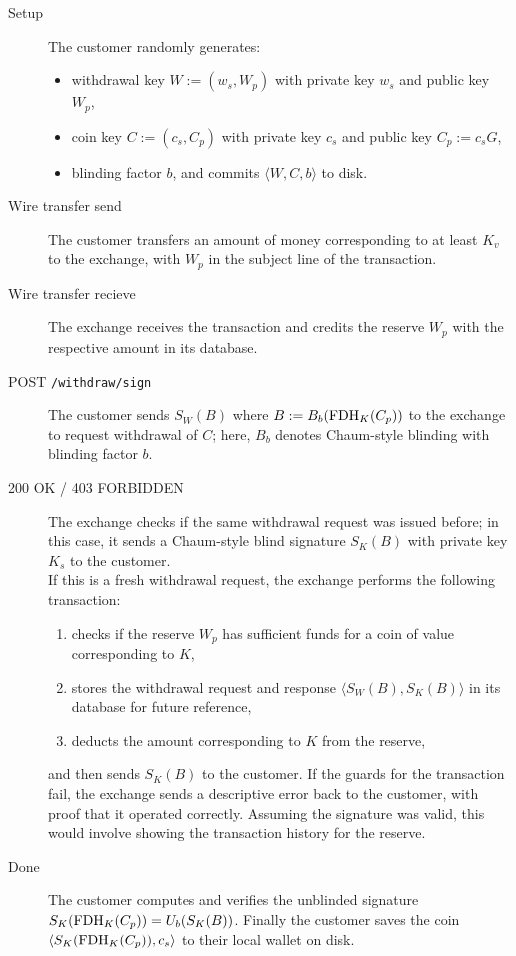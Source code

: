 \documentclass{llncs}
\begin{document}
\begin{description}
  \item[Setup] The customer randomly generates:
    \begin{itemize}
      \item withdrawal key $W := (w_s,W_p)$ with private key $w_s$ and public key $W_p$,
      \item coin key $C := (c_s,C_p)$ with private key $c_s$ and public key $C_p := c_s G$,
      \item blinding factor $b$, and commits $\langle W, C, b \rangle$ to disk.
    \end{itemize}
  \item[Wire transfer send]
    The customer transfers an amount of money corresponding to
    at least $K_v$ to the exchange, with $W_p$ in the subject line
    of the transaction.
  \item[Wire transfer recieve]
    The exchange receives the transaction and credits the reserve $W_p$
    with the respective amount in its database.
  \item[POST {\tt /withdraw/sign}]
    The customer sends $S_W(B)$ where $B := B_b(\textrm{FDH}_K(C_p))$ to
    the exchange to request withdrawal of $C$; here, $B_b$ denotes
    Chaum-style blinding with blinding factor $b$.
  \item[200 OK / 403 FORBIDDEN]
    The exchange checks if the same withdrawal request was issued before;
    in this case, it sends a Chaum-style blind signature $S_K(B)$ with
    private key $K_s$ to the customer. \\
    If this is a fresh withdrawal request, the exchange performs the following transaction:
    \begin{enumerate}
      \item checks if the reserve $W_p$ has sufficient funds
            for a coin of value corresponding to $K$,
      \item stores the withdrawal request and response
            $\langle S_W(B), S_K(B) \rangle$ in its database
            for future reference,
      \item deducts the amount corresponding to $K$ from the reserve,
    \end{enumerate}
    and then sends $S_K(B)$ to the customer.
    If the guards for the transaction fail, the exchange sends a descriptive
    error back to the customer, with proof that it operated correctly.
    Assuming the signature was valid, this would involve showing the transaction
    history for the reserve.
  \item[Done] The customer computes and verifies the unblinded signature
    $S_K(\textrm{FDH}_K(C_p)) = U_b(S_K(B))$.
    Finally the customer saves the coin $\langle S_K(\textrm{FDH}_K(C_p)), c_s \rangle$
    to their local wallet on disk.
\end{description}
\end{document}
